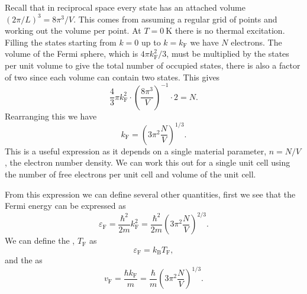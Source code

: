 \documentclass[fleqn]{NotesClass}
\newcommand*{\boltzmann}{k_{\mathrm{B}}}
\newcommand*{\fermi}{\mathrm{F}}
\begin{document}
    Recall that in reciprocal space every state has an attached volume \((2\pi/L)^3 = 8\pi^3/V\).
    This comes from assuming a regular grid of points and working out the volume per point.
    At \(T = \qty{0}{\kelvin}\) there is no thermal excitation.
    Filling the states starting from \(k = 0\) up to \(k = k_{\fermi}\) we have \(N\) electrons.
    The volume of the Fermi sphere, which is \(4\pi k_{\fermi}^2/3\), must be multiplied by the states per unit volume to give the total number of occupied states, there is also a factor of two since each volume can contain two states.
    This gives
    \begin{equation}
        \frac{4}{3}\pi k_{\fermi}^2 \cdot \left( \frac{8\pi^3}{V} \right)^{-1} \cdot 2 = N.
    \end{equation}
    Rearranging this we have
    \begin{equation}
        k_{\fermi} = \left( 3\pi^2\frac{N}{V} \right)^{1/3}.
    \end{equation}
    This is a useful expression as it depends on a single material parameter, \(n = N/V\), the electron number density.
    We can work this out for a single unit cell using the number of free electrons per unit cell and volume of the unit cell.
    
    From this expression we can define several other quantities, first we see that the Fermi energy can be expressed as
    \begin{equation}
        \varepsilon_{\fermi} = \frac{\hbar^2}{2m}k_{\fermi}^2 = \frac{\hbar^2}{2m} \left( 3\pi^2 \frac{N}{V} \right)^{2/3}.
    \end{equation}
    We can define the , \(T_{\fermi}\) as
    \begin{equation}
        \varepsilon_{\fermi} = \boltzmann T_{\fermi},
    \end{equation}
    and the  as
    \begin{equation}
        v_{\fermi} = \frac{\hbar k_{\fermi}}{m} = \frac{\hbar}{m}\left( 3\pi^2\frac{N}{V} \right)^{1/3}.
    \end{equation}
    
\end{document}
